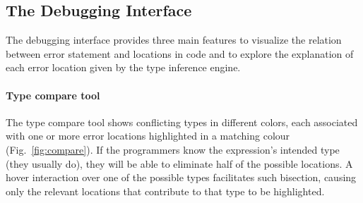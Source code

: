 

\subsection{The Debugging Interface}

The \chameleon{} debugging interface provides three main features to visualize the relation between error statement and locations in code and to explore the explanation of each error location given by the type inference engine. %


\paragraph{Type compare tool} \label{sub:type-compare}

The type compare tool shows conflicting types in different colors, each associated with one or more error locations highlighted in a matching colour (Fig.~\ref{fig:compare}).  
If the programmers know the expression's intended type (they usually do), they will be able to eliminate half of the possible locations. 
A hover interaction over one of the possible types facilitates such bisection, causing only the relevant locations that contribute to that type to be highlighted. 


